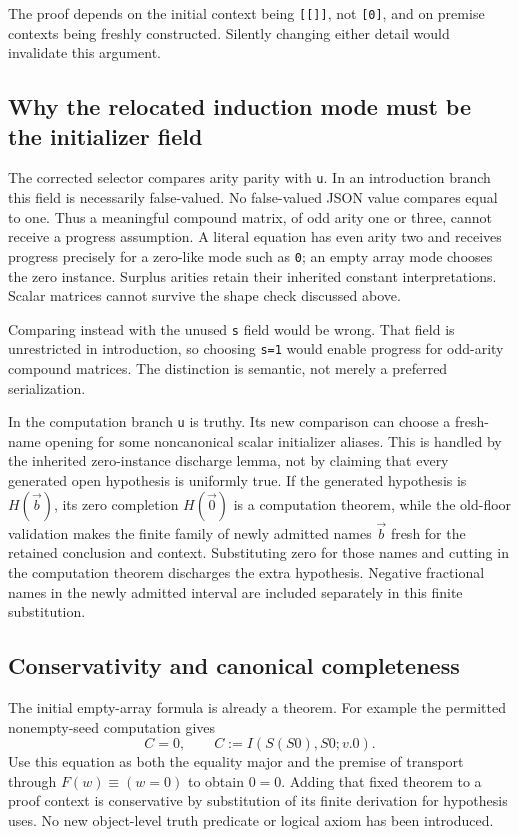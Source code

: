 The proof depends on the initial context being \texttt{[[]]}, not
\texttt{[0]}, and on premise contexts being freshly constructed.
Silently changing either detail would invalidate this argument.

\subsection{Why the relocated induction mode must be the initializer field}

The corrected selector compares arity parity with \texttt{u}.  In an
introduction branch this field is necessarily false-valued.  No
false-valued JSON value compares equal to one.  Thus a meaningful
compound matrix, of odd arity one or three, cannot receive a progress
assumption.  A literal equation has even arity two and receives
progress precisely for a zero-like mode such as \texttt{0}; an empty
array mode chooses the zero instance.  Surplus arities retain their
inherited constant interpretations.  Scalar matrices cannot survive
the shape check discussed above.

Comparing instead with the unused \texttt{s} field would be wrong.
That field is unrestricted in introduction, so choosing
\texttt{s=1} would enable progress for odd-arity compound matrices.
The distinction is semantic, not merely a preferred serialization.

In the computation branch \texttt{u} is truthy.  Its new comparison can
choose a fresh-name opening for some noncanonical scalar initializer
aliases.  This is handled by the inherited zero-instance discharge
lemma, not by claiming that every generated open hypothesis is
uniformly true.  If the generated hypothesis is $H(\vec b)$, its zero
completion $H(\vec0)$ is a computation theorem, while the old-floor
validation makes the finite family of newly admitted names $\vec b$
fresh for the retained conclusion and context.  Substituting zero for
those names and cutting in the computation theorem discharges the
extra hypothesis.  Negative fractional names in the newly admitted
interval are included separately in this finite substitution.

\subsection{Conservativity and canonical completeness}

The initial empty-array formula is already a theorem.  For example the
permitted nonempty-seed computation gives
\[
 C=0,\qquad C:=I(S(S0),S0;v.0).
\]
Use this equation as both the equality major and the premise of
transport through $F(w)\equiv(w=0)$ to obtain $0=0$.  Adding that fixed
theorem to a proof context is conservative by substitution of its
finite derivation for hypothesis uses.  No new object-level truth
predicate or logical axiom has been introduced.


